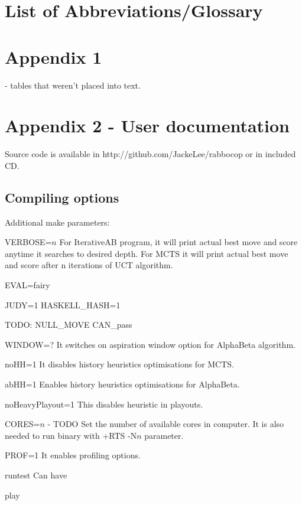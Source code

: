 \documentclass[12pt,titlepage,fleqn]{report}
\begin{document}
\chapter{List of Abbreviations/Glossary}

\chapter{Appendix 1}
- tables that weren't placed into text.

\chapter{Appendix 2 - User documentation}
Source code is available in http://github.com/JackeLee/rabbocop or in included CD.

\section{Compiling options}
Additional make parameters:

VERBOSE=$n$
  For IterativeAB program, it will print actual best move and score anytime
  it searches to desired depth.
  For MCTS it will print actual best move and score after n iterations of
  UCT algorithm.

EVAL=fairy

JUDY=1
HASKELL\_HASH=1

TODO: NULL\_MOVE CAN\_pass

WINDOW=?
	It switches on aspiration window option for AlphaBeta algorithm.

noHH=1
	It disables history heuristics optimisations for MCTS.

abHH=1
	Enables history heuristics optimisations for AlphaBeta.

noHeavyPlayout=1
	This disables heuristic in playouts.

CORES=$n$ - TODO
	Set the number of available cores in computer. It is also needed to run
	binary with +RTS -N$n$ parameter.

PROF=1
	It enables profiling options.

runtest
	Can have

play
\end{document}
